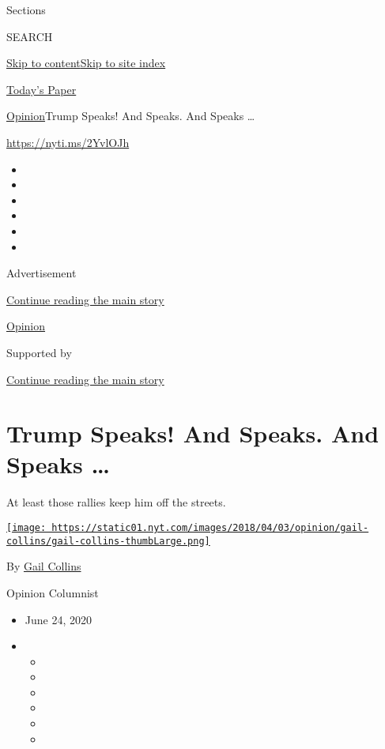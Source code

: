 Sections

SEARCH

\protect\hyperlink{site-content}{Skip to
content}\protect\hyperlink{site-index}{Skip to site index}

\href{https://myaccount.nytimes.com/auth/login?response_type=cookie\&client_id=vi}{}

\href{https://www.nytimes.com/section/todayspaper}{Today's Paper}

\href{/section/opinion}{Opinion}\textbar{}Trump Speaks! And Speaks. And
Speaks \ldots{}

\href{https://nyti.ms/2YvlOJh}{https://nyti.ms/2YvlOJh}

\begin{itemize}
\item
\item
\item
\item
\item
\item
\end{itemize}

Advertisement

\protect\hyperlink{after-top}{Continue reading the main story}

\href{/section/opinion}{Opinion}

Supported by

\protect\hyperlink{after-sponsor}{Continue reading the main story}

\hypertarget{trump-speaks-and-speaks-and-speaks-}{%
\section{Trump Speaks! And Speaks. And Speaks
\ldots{}}\label{trump-speaks-and-speaks-and-speaks-}}

At least those rallies keep him off the streets.

\href{https://www.nytimes.com/by/gail-collins}{\texttt{[image: https://static01.nyt.com/images/2018/04/03/opinion/gail-collins/gail-collins-thumbLarge.png]}}

By \href{https://www.nytimes.com/by/gail-collins}{Gail Collins}

Opinion Columnist

\begin{itemize}
\item
  June 24, 2020
\item
  \begin{itemize}
  \item
  \item
  \item
  \item
  \item
  \item
  \end{itemize}
\end{itemize}

